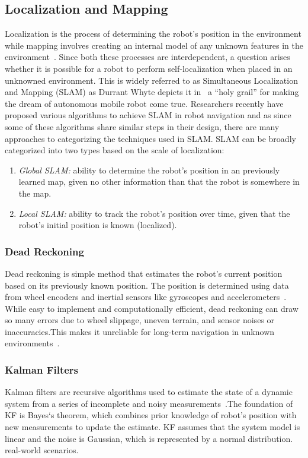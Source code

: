 \subsection{Localization and Mapping}
Localization is the process of determining the robot's position in the environment while mapping involves creating an internal
model of any unknown features in the environment~\cite{riisgaard2006slam}. Since both these processes are interdependent, a question arises whether it is
possible for a robot to perform self-localization when placed in an unknowned environment. This is widely referred to as
Simultaneous Localization and Mapping (SLAM) as Durrant Whyte depicts it in~\cite{durrant-whyte2006slam1} a ``holy grail'' for making the
dream of autonomous mobile robot come true. Researchers recently have proposed various algorithms to achieve SLAM in robot navigation and
as since some of these algorithms share similar steps in their design, there are many approaches to categorizing the techniques used in SLAM.\@
SLAM can be broadly categorized into two types based on the scale of localization:
\begin{enumerate}
    \item \textit{Global SLAM:} ability to determine the robot's position in an previously learned map, given no other information than
    that the robot is somewhere in the map.
    \item \textit{Local SLAM:} ability to track the robot's position over time, given that the robot's initial position is known (localized).
\end{enumerate}

\subsubsection{Dead Reckoning}
Dead reckoning is simple method that estimates the robot's current position based on its previously known position. The
position is determined using data from wheel encoders and inertial sensors like gyroscopes and accelerometers~\cite{borenstein1997mobile}.
While easy to implement and computationally efficient, dead reckoning can draw so many errors due to wheel slippage, uneven terrain, and
sensor noises or inaccuracies.This makes it unreliable for long-term navigation in unknown environments~\cite{PARK1998219}.
\subsubsection{Kalman Filters}
Kalman filters are recursive algorithms used to estimate the state of a dynamic system from a series of incomplete and noisy
measurements~\cite{thrun2005probabilistic}.\@ The foundation of KF is Bayes`s theorem, which combines prior knowledge of robot's position with new measurements to update
the estimate.
KF assumes that the system model is linear and the noise is Gaussian, which is represented by a normal distribution.
real-world scenarios. \\

